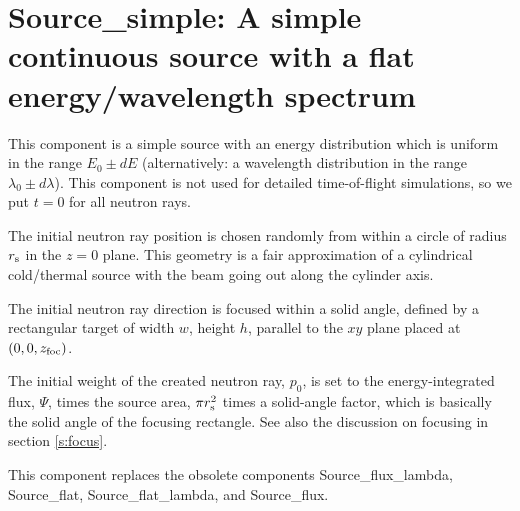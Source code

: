 \section{Source\_simple: A simple continuous source
with a flat energy/wavelength spectrum}
\label{source-simple}


This component is
a simple source with an energy distribution which is uniform
in the range $E_0 \pm dE$
(alternatively: a wavelength distribution in the range $\lambda_0 \pm d\lambda$).
This component is not used for detailed time-of-flight simulations,
so we put $t=0$ for all neutron rays.

The initial neutron ray position is chosen randomly from within a
circle of radius $r_{\rm s}$ in the $z=0$ plane.
This geometry is a fair approximation
of a cylindrical cold/thermal source with the beam going out along
the cylinder axis.

The initial neutron ray direction is focused within
a solid angle, defined by a rectangular target of width
$w$, height $h$, parallel to
the $xy$ plane placed at $(0,0,z_{\rm foc})$.

The initial weight of the created neutron ray, $p_0$, is set to the
energy-integrated flux, $\Psi$, times the source area, $\pi r_{\rm s}^2$
times a solid-angle factor, which is basically the
solid angle of the focusing rectangle.
See also the discussion on focusing in section \ref{s:focus}.

This component replaces the obsolete components
Source\_flux\_lambda, Source\_flat, Source\_flat\_lambda, and Source\_flux.
